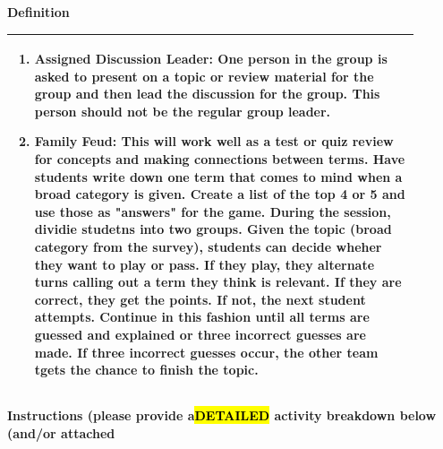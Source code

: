 \documentclass{article}
\begin{document}
\vspace{0.5cm}

{\large\textbf{Definition}}\\
\noindent
\begin{tabular}{|p{0.9\linewidth}|}
\hline
\begin{enumerate}
    \item\textbf{Assigned Discussion Leader:} One person in the group is asked to present on a topic or review material for the group and then lead the discussion for the group. This person should not be the regular group leader.
    \item\textbf{Family Feud:} This will work well as a test or quiz review for concepts and making connections between terms. Have students write down one term that comes to mind when a broad category is given. Create a list of the top 4 or 5 and use those as "answers" for the game. During the session, dividie studetns into two groups. Given the topic (broad category from the survey), students can decide wheher they want to play or pass. If they play, they alternate turns calling out a term they think is relevant. If they are correct, they get the points. If not, the next student attempts. Continue in this fashion until all terms are guessed and explained or three incorrect guesses are made. If three incorrect guesses occur, the other team tgets the chance to finish the topic.  
    \end{enumerate}\\
\hline
\end{tabular}
\vspace{0.2cm}
\newpage
{\large\textbf{Instructions (please provide a\hl{DETAILED} activity breakdown below (and/or attached}}\\
\noindent
\end{document}

